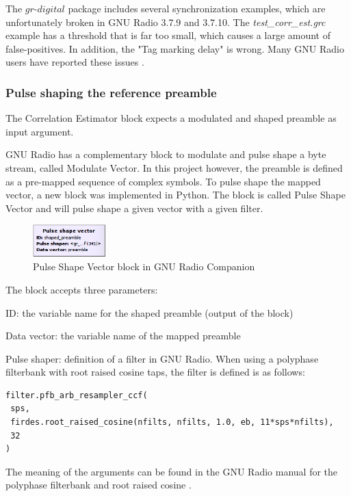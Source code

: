 The $gr$-$digital$ package includes several synchronization examples, which are unfortunately broken in GNU Radio 3.7.9 and 3.7.10. The \textit{test\_corr\_est.grc} example has a threshold that is far too small, which causes a large amount of false-positives. In addition, the "Tag marking delay" is wrong. Many GNU Radio users have reported these issues \cite{corr_est_github_issue}.





\subsubsection{Pulse shaping the reference preamble}
The Correlation Estimator block expects a modulated and shaped preamble as input argument. \medskip

GNU Radio has a complementary block to modulate and pulse shape a byte stream, called Modulate Vector. In this project however, the preamble is defined as a pre-mapped sequence of complex symbols. To pulse shape the mapped vector, a new block was implemented in Python. The block is called Pulse Shape Vector and will pulse shape a given vector with a given filter. \medskip

\begin{figure}[H]
    \centering
    \includegraphics[width=0.25\textwidth]{img_commchain/pulseshaper_block.png}
    \caption{Pulse Shape Vector block in GNU Radio Companion}
    \label{fig:pulseshaper_block}
\end{figure}

The block accepts three parameters: 
\begin{tight_itemize}
\item ID: the variable name for the shaped preamble (output of the block)
\item Data vector: the variable name of the mapped preamble
\item Pulse shaper: definition of a filter in GNU Radio.
When using a polyphase filterbank with root raised cosine taps, the filter is defined is as follows:
\begin{verbatim}
filter.pfb_arb_resampler_ccf(
 sps,
 firdes.root_raised_cosine(nfilts, nfilts, 1.0, eb, 11*sps*nfilts),
 32
) 
\end{verbatim}
The meaning of the arguments can be found in the GNU Radio manual for the polyphase filterbank \cite{gr_pfb} and root raised cosine \cite{gr_rrc}.
\end{tight_itemize}




